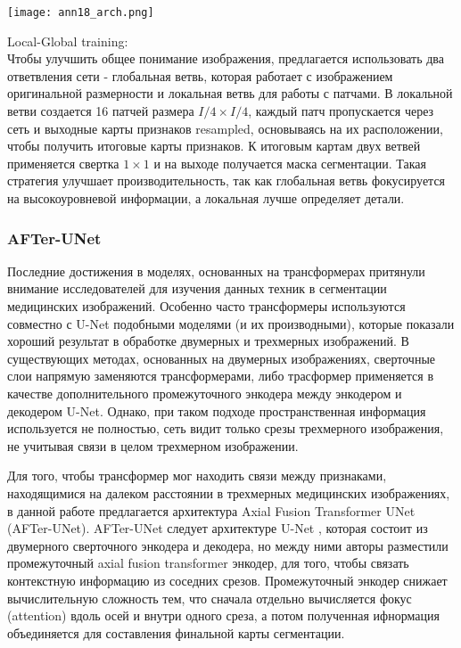 \begin{minipage}{1.0\linewidth}
    \begin{center}
        \texttt{[image: ann18\_arch.png]} 
    \end{center} 

\end{minipage} 

Local-Global training:\\

Чтобы улучшить общее понимание изображения, предлагается использовать 
два ответвления сети - глобальная ветвь, которая работает с 
изображением оригинальной размерности и локальная ветвь для работы с патчами. 
В локальной ветви создается 16 патчей размера \(I/4 \times I/4\), каждый патч 
пропускается через сеть и выходные карты признаков resampled, основываясь на их расположении, 
чтобы получить итоговые карты признаков. К итоговым картам двух ветвей применяется 
свертка \(1\times 1\) и на выходе получается маска сегментации. 
Такая стратегия улучшает производительность, так как глобальная ветвь 
фокусируется на высокоуровневой информации, а локальная лучше определяет детали.\\



\subsubsection*{AFTer-UNet}

Последние достижения в моделях, основанных на трансформерах \cite{Transformers} 
притянули внимание исследователей для изучения данных техник в сегментации медицинских изображений. Особенно часто 
трансформеры используются совместно с U-Net подобными моделями (и их производными), которые
показали хороший результат в обработке двумерных и трехмерных изображений. В существующих методах, основанных на двумерных изображениях,
сверточные слои напрямую заменяются трансформерами, либо трасформер
применяется в качестве дополнительного промежуточного энкодера между
энкодером и декодером U-Net. Однако, при таком подходе пространственная
информация используется не полностью, сеть видит только срезы трехмерного изображения,
 не учитывая связи в целом трехмерном изображении. \par

 Для того, чтобы трансформер мог находить связи между признаками, 
 находящимися на далеком расстоянии в трехмерных медицинских изображениях,
 в данной работе\cite{ATerUnet} предлагается архитектура Axial Fusion Transformer UNet (AFTer-UNet).
 AFTer-UNet следует архитектуре U-Net \cite{Unet}, которая состоит из двумерного сверточного энкодера 
 и декодера, но между ними авторы разместили промежуточный axial fusion transformer энкодер, 
 для того, чтобы связать контекстную информацию из соседних срезов. Промежуточный 
 энкодер снижает вычислительную сложность тем, что сначала отдельно вычисляется 
 фокус (attention) вдоль осей и внутри одного среза, а потом полученная ифнормация 
 объединяется для составления финальной карты сегментации. \par
 
